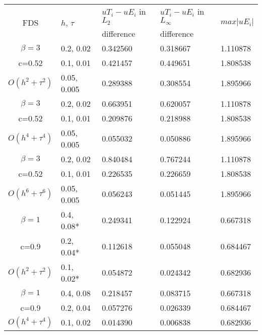 \documentclass{article}
\begin{document}
\begin{table}[ht]
\centering
\small
		\begin{tabular}{||c|l|l|l|l||}
			\hline
			\hline
      \multirow{2  }{*}{FDS}        & \multirow{2  }{*}{$h$, $\tau$}  &   $uT_i - uE_i$  in $L_2$     &  $uT_i - uE_i$ in $L_\infty$ & \multirow{2  }{*}{$max|uE_i|$} \\
	                                        &                                                     &      difference                     &           difference                  &                                                       \\
   			\hline 
					\hline 
  $\beta=3$                   &0.2, 0.02         &  0.342560       & 0.318667  & 1.110878      \\
   c=0.52                        &0.1, 0.01         &  0.421457       & 0.449651 &  1.808538     \\
     $O(h^2 + \tau^ 2)$ &0.05, 0.005    & 0.289388         &0.308554  &   1.895966    \\
			\hline 
  $\beta=3$                 &0.2, 0.02        & 0.663951           &0.620057 & 1.110878     \\
   c=0.52                      &0.1, 0.01       & 0.209876            &0.218988 & 1.808538    \\
     $O(h^4+ \tau^4)$ &0.05,  0.005  &0.055032             &0.050886 & 1.895966    \\
			\hline 
  $\beta=3$                  &0.2, 0.02       & 0.840484             & 0.767244  &  1.110878  \\
     c=0.52                     &0.1, 0.01       & 0.226535             &  0.226659 &  1.808538  \\
     $O(h^6+ \tau^6)$  &0.05, 0.005  &  0.056243            &  0.051445 &   1.895966\\
	   \hline
			\hline 
       $\beta=1$          &0.4, 0.08*        & 0.249341     & 0.122924  & 0.667318   \\
                  c=0.9      &0.2, 0.04*        & 0.112618      & 0.055048  & 0.684467   \\
  $O(h^2+ \tau^2)$ &0.1, 0.02*         & 0.054872      &0.024342 & 0.682936  \\
			\hline
      $\beta=1$               & 0.4, 0.08     & 0.218457    & 0.083715  & 0.667318    \\
       c=0.9                      & 0.2, 0.04      & 0.057276   &  0.026339 &  0.684467 \\
       $O(h^4+ \tau^4)$ & 0.1, 0.02   & 0.014390   &0.006838 &   0.682936 \\

\end{tabular}
\end{table}
\end{document}
